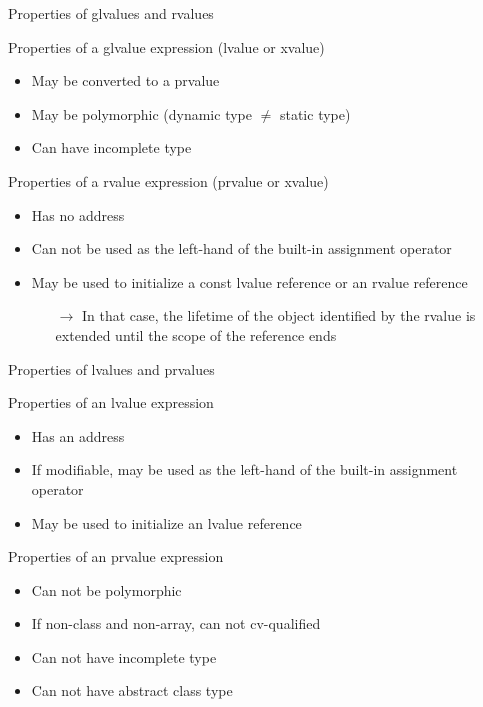 \begin{frame}{Properties of glvalues and rvalues}{}
  \begin{block}{Properties of a glvalue expression (lvalue or xvalue)}
    \begin{itemize}
    \item
      May be converted to a prvalue
    \item
      May be polymorphic (dynamic type $\neq$ static type)
    \item
      Can have incomplete type
    \end{itemize}
  \end{block}

  \begin{block}{Properties of a rvalue expression (prvalue or xvalue)}
    \begin{itemize}
    \item
      Has no address
    \item
      Can not be used as the left-hand of the built-in assignment operator
    \item
      May be used to initialize a const lvalue reference or an rvalue reference
      \begin{itemize}
      \item[$\to$]
        In that case, the lifetime of the object identified by the rvalue is extended until the scope of the reference ends
      \end{itemize}
    \end{itemize}
  \end{block}
\end{frame}

\begin{frame}{Properties of lvalues and prvalues}{}
  \begin{block}{Properties of an lvalue expression}
    \begin{itemize}
    \item
      Has an address
    \item
      If modifiable, may be used as the left-hand of the built-in assignment operator
    \item
      May be used to initialize an lvalue reference
    \end{itemize}
  \end{block}

  \begin{block}{Properties of an prvalue expression}
    \begin{itemize}
    \item
      Can not be polymorphic
    \item
      If non-class and non-array, can not cv-qualified
    \item
      Can not have incomplete type
    \item
      Can not have abstract class type
    \end{itemize}
  \end{block}
\end{frame}

